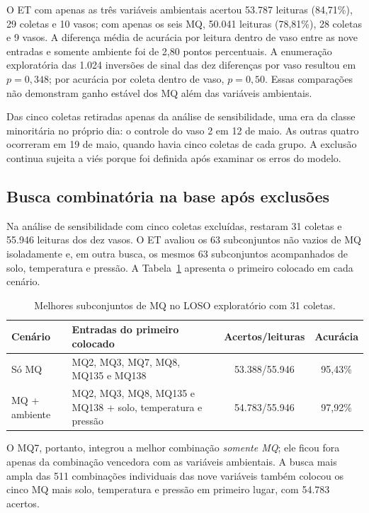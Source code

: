 O ET com apenas as três variáveis ambientais acertou 53.787 leituras
(84,71\%), 29 coletas e 10 vasos; com apenas os seis MQ, 50.041 leituras
(78,81\%), 28 coletas e 9 vasos. A diferença média de acurácia por
leitura dentro de vaso entre as nove entradas e somente ambiente foi de
2,80 pontos percentuais. A enumeração exploratória das 1.024 inversões
de sinal das dez diferenças por vaso resultou em $p=0{,}348$; por acurácia
por coleta dentro de vaso, $p=0{,}50$. Essas comparações não demonstram
ganho estável dos MQ além das variáveis ambientais.

Das cinco coletas retiradas apenas da análise de sensibilidade, uma era
da classe minoritária no próprio dia: o controle do vaso 2 em 12 de maio.
As outras quatro ocorreram em 19 de maio, quando havia cinco coletas de
cada grupo. A exclusão continua sujeita a viés porque foi definida após
examinar os erros do modelo.

\subsection{Busca combinatória na base após exclusões}
\label{subsec:resultados_busca_combinatoria_filtrada}

Na análise de sensibilidade com cinco coletas excluídas, restaram 31
coletas e 55.946 leituras dos dez vasos. O ET avaliou os 63 subconjuntos
não vazios de MQ isoladamente e, em outra busca, os mesmos 63 subconjuntos
acompanhados de solo, temperatura e pressão. A
Tabela~\ref{tab:busca_mq_filtrada} apresenta o primeiro colocado em cada
cenário.
\begin{table}[H]
    \centering
    \footnotesize
    \caption{Melhores subconjuntos de MQ no LOSO exploratório com 31 coletas.}
    \label{tab:busca_mq_filtrada}
    \begin{tabular}{p{}p{}cc}
        \hline
        Cenário & Entradas do primeiro colocado & Acertos/leituras & Acurácia \\
        \hline
        Só MQ & MQ2, MQ3, MQ7, MQ8, MQ135 e MQ138 & 53.388/55.946 & 95,43\% \\
        MQ + ambiente & MQ2, MQ3, MQ8, MQ135 e MQ138 + solo, temperatura e pressão & 54.783/55.946 & 97,92\% \\
        \hline
    \end{tabular}
\end{table}
O MQ7, portanto, integrou a melhor combinação \emph{somente MQ}; ele
ficou fora apenas da combinação vencedora com as variáveis ambientais.
A busca mais ampla das 511 combinações individuais das nove variáveis
também colocou os cinco MQ mais solo, temperatura e pressão em primeiro
lugar, com 54.783 acertos.

